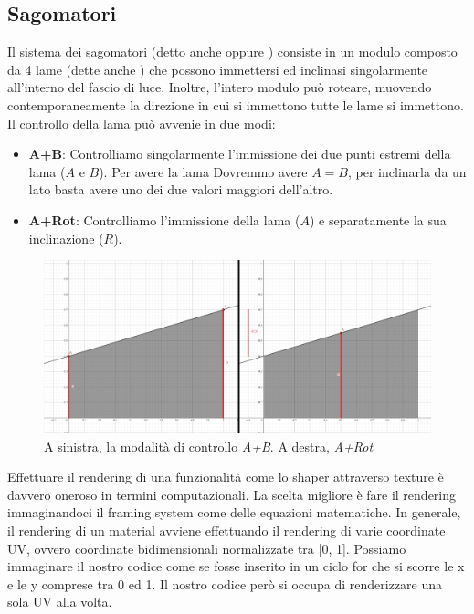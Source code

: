 \documentclass[main.tex]{subfiles}
\begin{document}
\subsection{Sagomatori}\label{subsec:5_shaper}
Il sistema dei sagomatori (detto anche  oppure ) consiste in un modulo composto da 4 lame (dette anche ) che possono immettersi ed inclinasi singolarmente all'interno del fascio di luce. Inoltre, l'intero modulo può roteare, muovendo contemporaneamente la direzione in cui si immettono tutte le lame si immettono.
Il controllo della lama può avvenie in due modi:
\begin{itemize}
	\item \textbf{A+B}: Controlliamo singolarmente l'immissione dei due punti estremi della lama ($A$ e $B$). Per avere la lama  Dovremmo avere $A = B$, per inclinarla da un lato basta avere uno dei due valori maggiori dell'altro.
	\item \textbf{A+Rot}: Controlliamo l'immissione della lama ($A$) e separatamente la sua inclinazione ($R$).
\end{itemize}
\begin{figure}[H]
    \centering
    \includegraphics[width=1\linewidth]{img/newFeatures/abVSarot.png}
    \caption{A sinistra, la modalità di controllo \textit{A+B}. A destra, \textit{A+Rot}}
    \label{fig:5_shaperDifferentModes}
\end{figure}

Effettuare il rendering di una funzionalità come lo shaper attraverso texture è davvero oneroso in termini computazionali. La scelta migliore è fare il rendering immaginandoci il framing system come delle equazioni matematiche. In generale, il rendering di un material avviene effettuando il rendering di varie coordinate UV, ovvero coordinate bidimensionali normalizzate tra [0, 1]. Possiamo immaginare il nostro codice come se fosse inserito in un ciclo for che si scorre  le x e le y comprese tra 0 ed 1. Il nostro codice però si occupa di renderizzare una sola UV alla volta. 
\end{document}
